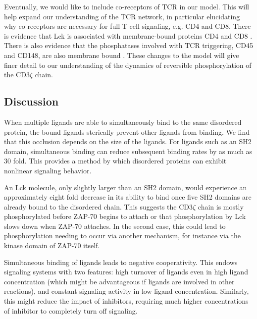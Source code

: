 \documentclass[../../AdvancementSummary.tex]{subfiles}
\begin{document}
Eventually, we would like to include co-receptors of TCR in our model. This will help expand our understanding of the TCR network, in particular elucidating why co-receptors are necessary for full T cell signaling, e.g. CD4 and CD8. There is evidence that Lck is associated with membrane-bound proteins CD4 and CD8 \cite{Barber1989, Veillette1988, Rudd1988}. There is also evidence that the phosphatases involved with TCR triggering, CD45 and CD148, are also membrane bound \cite{Davis2006}. These changes to the model will give finer detail to our understanding of the dynamics of reversible phosphorylation of the CD3$\zeta$ chain.




\subsection{Discussion}

When multiple ligands are able to simultaneously bind to the same disordered protein, the bound ligands sterically prevent other ligands from binding. We find that this occlusion depends on the size of the ligands. For ligands such as an SH2 domain, simultaneous binding can reduce subsequent binding rates by as much as 30 fold. This provides a method by which disordered proteins can exhibit nonlinear signaling behavior. 

An Lck molecule, only slightly larger than an SH2 domain, would experience an approximately eight fold decrease in its ability to bind once five SH2 domains are already bound to the disordered chain. This suggests the CD3$\zeta$ chain is mostly phosphorylated before ZAP-70 begins to attach or that phosphorylation by Lck slows down when ZAP-70 attaches. In the second case, this could lead to phosphorylation needing to occur via another mechanism, for instance via the kinase domain of ZAP-70 itself. 

Simultaneous binding of ligands leads to negative cooperativity. This endows signaling systems with two features: high turnover of ligands even in high ligand concentration (which might be advantageous if ligands are involved in other reactions), and constant signaling activity in low ligand concentration. Similarly, this might reduce the impact of inhibitors, requiring much higher concentrations of inhibitor to completely turn off signaling.



\end{document}
